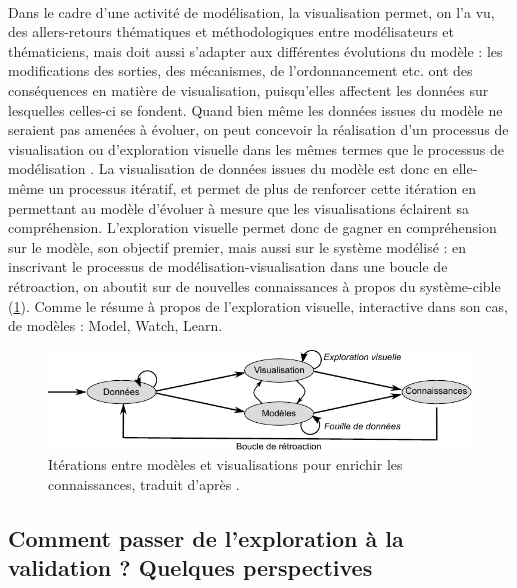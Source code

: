 \paragraph[Ccl : Modélisation et visualisation]{}
Dans le cadre d'une activité de modélisation, la visualisation permet, on l'a vu, des allers-retours thématiques et méthodologiques entre modélisateurs et thématiciens, mais doit aussi s'adapter aux différentes évolutions du modèle :
	les modifications des sorties, des mécanismes, de l'ordonnancement etc. ont des conséquences en matière de visualisation, puisqu'elles affectent les données sur lesquelles celles-ci se fondent.
Quand bien même les données issues du modèle ne seraient pas amenées à évoluer, on peut concevoir la réalisation d'un processus de visualisation ou d'exploration visuelle dans les mêmes termes que le processus de modélisation \autocite{andrienko2018viewing}.
La visualisation de données issues du modèle est donc en elle-même un processus itératif, et permet de plus de renforcer cette itération en permettant au modèle d'évoluer à mesure que les visualisations éclairent sa compréhension.
L'exploration visuelle permet donc de gagner en compréhension sur le modèle, son objectif premier, mais aussi sur le système modélisé :
	en inscrivant le processus de modélisation-visualisation dans une boucle de rétroaction, on aboutit sur de nouvelles connaissances à propos du système-cible (\cref{fig:schema-va}).
Comme le résume \textcite{victor_simulation_2009} à propos de l'exploration visuelle, interactive dans son cas, de modèles : \og Model, Watch, Learn\fg{}.

\begin{figure}[H]
	\centering
	\includegraphics[width=\linewidth]{img/schema_keim.pdf}
	
	\caption[Itérations entre modèles et visualisations pour enrichir les connaissances.]{Itérations entre modèles et visualisations pour enrichir les connaissances, traduit d'après \textcite[fig.~1, p.~156]{keim_visual_2008}.}
	\label{fig:schema-va}
\end{figure}


\subsection{Comment passer de l'exploration à la validation ? Quelques perspectives}


